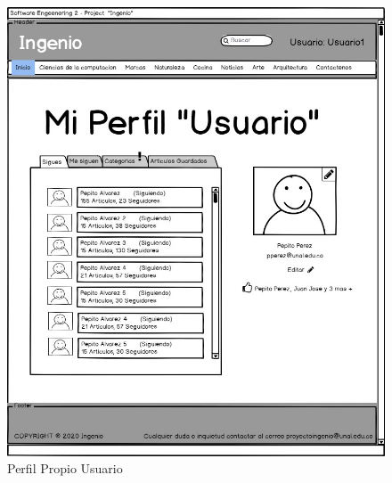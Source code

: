 \documentclass[a4paper,12 pt]{article}
\begin{document}
\begin{figure}[H]
    \centering
    \includegraphics[scale = 0.9]{images/PerfilPropioUsuario.jpg}
    \caption{Perfil Propio Usuario}
    \label{F105}
\end{figure}{}
\end{document}
